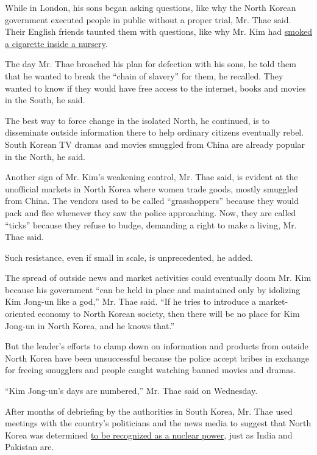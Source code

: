 While in London, his sons began asking questions, like why the North
Korean government executed people in public without a proper trial, Mr.
Thae said. Their English friends taunted them with questions, like why
Mr. Kim had \href{http://i.imgur.com/NjWEnVp.jpg}{smoked a cigarette
inside a nursery}.

The day Mr. Thae broached his plan for defection with his sons, he told
them that he wanted to break the ``chain of slavery'' for them, he
recalled. They wanted to know if they would have free access to the
internet, books and movies in the South, he said.

The best way to force change in the isolated North, he continued, is to
disseminate outside information there to help ordinary citizens
eventually rebel. South Korean TV dramas and movies smuggled from China
are already popular in the North, he said.

Another sign of Mr. Kim's weakening control, Mr. Thae said, is evident
at the unofficial markets in North Korea where women trade goods, mostly
smuggled from China. The vendors used to be called ``grasshoppers''
because they would pack and flee whenever they saw the police
approaching. Now, they are called ``ticks'' because they refuse to
budge, demanding a right to make a living, Mr. Thae said.

Such resistance, even if small in scale, is unprecedented, he added.

The spread of outside news and market activities could eventually doom
Mr. Kim because his government ``can be held in place and maintained
only by idolizing Kim Jong-un like a god,'' Mr. Thae said. ``If he tries
to introduce a market-oriented economy to North Korean society, then
there will be no place for Kim Jong-un in North Korea, and he knows
that.''

But the leader's efforts to clamp down on information and products from
outside North Korea have been unsuccessful because the police accept
bribes in exchange for freeing smugglers and people caught watching
banned movies and dramas.

``Kim Jong-un's days are numbered,'' Mr. Thae said on Wednesday.

After months of debriefing by the authorities in South Korea, Mr. Thae
used meetings with the country's politicians and the news media to
suggest that North Korea was determined
\href{https://www.nytimes3xbfgragh.onion/2016/12/27/world/asia/thae-yong-ho-north-korea-defector.html}{to
be recognized as a nuclear power}, just as India and Pakistan are.

